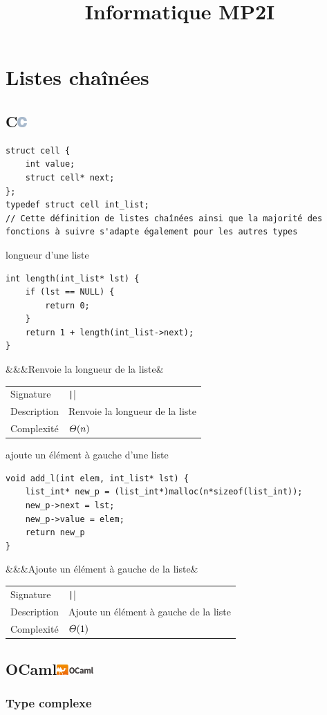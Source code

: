 \documentclass[a4paper,12pt,titlepage]{article}
\title{Informatique MP2I}
\author{}
\date{}
\renewcommand{\c}{\subsection[C]{C\hfill\protect\includegraphics[height=11pt]{C}}}
\newcommand{\ocaml}{\subsection[OCaml]{OCaml\hfill\protect\includegraphics[height=11pt]{Ocaml}}}
\let\oldsection\section
\renewcommand\section{\clearpage\oldsection}
\let\oldleft\left
\renewcommand{\left}{\mathopen{}\mathclose\bgroup\oldleft}
\let\oldright\right
\renewcommand{\right}{\aftergroup\egroup\oldright}
\newcommand{\Th}[1]{\ensuremath{\varTheta\left(#1\right)}}
\newcommand{\info}[4][]{\def\argI{}\ifx&#2&\else\def\argI{Signature&\texttt|#2|\\}\fi\def\argII{}\ifx&#3&\else\def\argII{Description&#3\\}\fi\begin{tabularx}{\textwidth}{AB}\argI\argII Complexité&#4#1\end{tabularx}}
\begin{document}
\maketitle
\null\newpage
\tableofcontents
\null\newpage
\null\newpage
{}
\section{Listes chaînées}
\c
\begin{tp*}{}
\begin{verbatim}
struct cell {
    int value;
    struct cell* next;
};
typedef struct cell int_list;
// Cette définition de listes chaînées ainsi que la majorité des fonctions à suivre s'adapte également pour les autres types
\end{verbatim}
\end{tp*}
\begin{fnc*}{longueur d'une liste}
\begin{verbatim}
int length(int_list* lst) {
    if (lst == NULL) {
        return 0;
    }
    return 1 + length(int_list->next);
}
\end{verbatim}
\info{}{Renvoie la longueur de la liste}{\Th{n}}
\end{fnc*}
\begin{fnc*}{ajoute un élément à gauche d'une liste}
\begin{verbatim}
void add_l(int elem, int_list* lst) {
    list_int* new_p = (list_int*)malloc(n*sizeof(list_int));
    new_p->next = lst;
    new_p->value = elem;
    return new_p
}
\end{verbatim}
\info{}{Ajoute un élément à gauche de la liste}{\Th{1}}
\end{fnc*}
\ocaml
\subsubsection{Type complexe}
\end{document}
